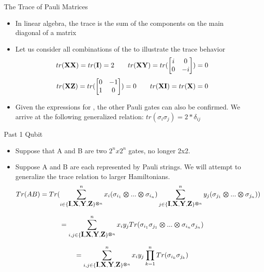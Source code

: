 \begin{frame}{The Trace of Pauli Matrices}
\begin{itemize}
    \item In linear algebra, the trace is the sum of the components on the main diagonal of a matrix
    \item Let us consider all combinations of the \PauliX \hspace{1mm} to illustrate the trace behavior
    \[ tr(\mbox{\bfseries{\textrm{X}}} \mbox{\bfseries{\textrm{X}}}) = tr(\mbox{\bfseries{\textrm{I}}}) = 2  \quad \quad tr(\mbox{\bfseries{\textrm{X}}} \mbox{\bfseries{\textrm{Y}}}) = tr(\begin{bmatrix}
        i & 0 \\
        0 & -i \\
    \end{bmatrix}) = 0\]
    \[ tr(\mbox{\bfseries{\textrm{X}}} \mbox{\bfseries{\textrm{Z}}}) = tr(\begin{bmatrix}
        0 & -1 \\
        1 & 0 \\
    \end{bmatrix}) = 0 \quad \quad tr(\mbox{\bfseries{\textrm{X}}} \mbox{\bfseries{\textrm{I}}}) = tr(\mbox{\bfseries{\textrm{X}}}) = 0 \]

    \item Given the expressions for \PauliX, the other Pauli gates can also be confirmed. We arrive at the following generalized relation: $tr(\sigma_i \sigma_j) = 2*\delta_{ij}$
    
\end{itemize}    
\end{frame}

\begin{frame}{Past 1 Qubit}
    \begin{itemize}
        \item Suppose that A and B are two $2^n x 2^n$ gates, no longer 2x2.
        \item Suppose A and B are each represented by Pauli strings. We will attempt to generalize the trace relation to larger Hamiltonians.
    \[Tr(AB) = Tr(\sum_{i \in \{\mbox{\bfseries{\textrm{I}}},\mbox{\bfseries{\textrm{X}}},\mbox{\bfseries{\textrm{Y}}},\mbox{\bfseries{\textrm{Z}}}\}^{\bm{\otimes} n}}^n x_i (\sigma_{i_{1}} \bm{\otimes} ... \bm{\otimes} \sigma_{i_{n}}) \sum_{j \in \{\mbox{\bfseries{\textrm{I}}},\mbox{\bfseries{\textrm{X}}},\mbox{\bfseries{\textrm{Y}}},\mbox{\bfseries{\textrm{Z}}}\}^{\bm{\otimes} n}}^n y_j (\sigma_{j_{1}} \bm{\otimes} ... \bm{\otimes} \sigma_{j_{n}}))
    \]

    
    \[= \sum_{i,j \in \{\mbox{\bfseries{\textrm{I}}},\mbox{\bfseries{\textrm{X}}},\mbox{\bfseries{\textrm{Y}}},\mbox{\bfseries{\textrm{Z}}}\}^{\bm{\otimes} n}}^n x_i y_j Tr(\sigma_{i_{1}}\sigma_{j_1} \bm{\otimes} ... \bm{\otimes} \sigma_{i_{n}}\sigma_{j_n})
    \]

    \[= \sum_{i,j \in \{\mbox{\bfseries{\textrm{I}}},\mbox{\bfseries{\textrm{X}}},\mbox{\bfseries{\textrm{Y}}},\mbox{\bfseries{\textrm{Z}}}\}^{\bm{\otimes} n}}^n x_i y_j \prod_{k=1}^n Tr(\sigma_{i_k} \sigma_{j_k})
    \]
        
    \end{itemize}
    
\end{frame}

